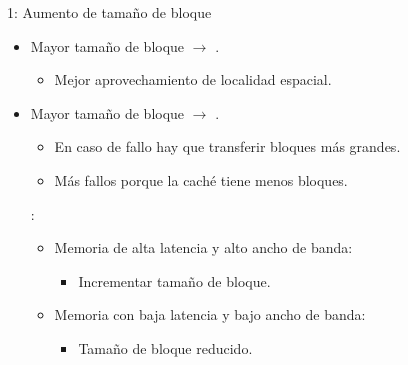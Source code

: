 \begin{frame}[t]{1: Aumento de tamaño de bloque}
\begin{itemize}
  \item Mayor tamaño de bloque $\rightarrow$ .
    \begin{itemize}
       \item Mejor aprovechamiento de localidad espacial.
    \end{itemize}

  \item Mayor tamaño de bloque $\rightarrow$ .
    \begin{itemize}
      \item En caso de fallo hay que transferir bloques más grandes.
      \item Más fallos porque la caché tiene menos bloques.
    \end{itemize}

  :
    \begin{itemize}
      \item Memoria de alta latencia y alto ancho de banda:
        \begin{itemize}
          \item Incrementar tamaño de bloque.
        \end{itemize}
      \item Memoria con baja latencia y bajo ancho de banda:
        \begin{itemize}
          \item Tamaño de bloque reducido.
        \end{itemize}
    \end{itemize}
\end{itemize}
\end{frame}


